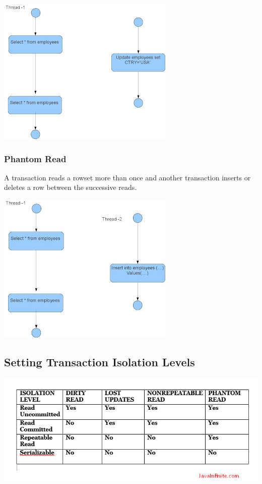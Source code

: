 \includegraphics{./images/chapter-tx/NonRepeatable.JPG}

\subsubsection{Phantom Read}

A transaction reads a rowset more than once and another transaction inserts or deletes a row between the successive reads.

\includegraphics{./images/chapter-tx/PhantomRead.JPG}

\subsection{Setting Transaction Isolation Levels}

\includegraphics{./images/chapter-tx/isolation_level.png}

